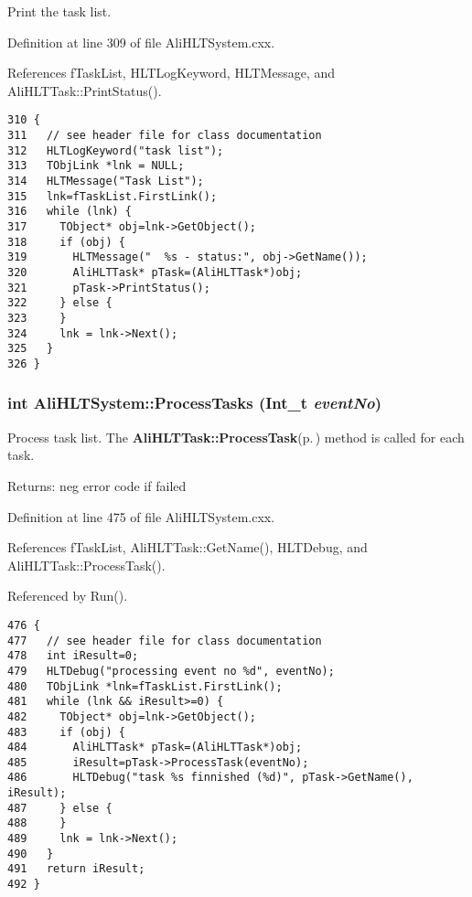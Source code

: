 Print the task list. 

Definition at line 309 of file Ali\-HLTSystem.cxx.

References f\-Task\-List, HLTLog\-Keyword, HLTMessage, and Ali\-HLTTask::Print\-Status().

\footnotesize\begin{verbatim}310 {
311   // see header file for class documentation
312   HLTLogKeyword("task list");
313   TObjLink *lnk = NULL;
314   HLTMessage("Task List");
315   lnk=fTaskList.FirstLink();
316   while (lnk) {
317     TObject* obj=lnk->GetObject();
318     if (obj) {
319       HLTMessage("  %s - status:", obj->GetName());
320       AliHLTTask* pTask=(AliHLTTask*)obj;
321       pTask->PrintStatus();
322     } else {
323     }
324     lnk = lnk->Next();
325   }
326 }
\end{verbatim}\normalsize 


\subsubsection{\setlength{\rightskip}{0pt plus 5cm}int Ali\-HLTSystem::Process\-Tasks (Int\_\-t {\em event\-No})}\label{classAliHLTSystem_a17}


Process task list. The {\bf Ali\-HLTTask::Process\-Task}{\rm (p.\,\pageref{classAliHLTTask_a20})} method is called for each task. \begin{Desc}
\item[Returns:]neg error code if failed \end{Desc}


Definition at line 475 of file Ali\-HLTSystem.cxx.

References f\-Task\-List, Ali\-HLTTask::Get\-Name(), HLTDebug, and Ali\-HLTTask::Process\-Task().

Referenced by Run().

\footnotesize\begin{verbatim}476 {
477   // see header file for class documentation
478   int iResult=0;
479   HLTDebug("processing event no %d", eventNo);
480   TObjLink *lnk=fTaskList.FirstLink();
481   while (lnk && iResult>=0) {
482     TObject* obj=lnk->GetObject();
483     if (obj) {
484       AliHLTTask* pTask=(AliHLTTask*)obj;
485       iResult=pTask->ProcessTask(eventNo);
486       HLTDebug("task %s finnished (%d)", pTask->GetName(), iResult);
487     } else {
488     }
489     lnk = lnk->Next();
490   }
491   return iResult;
492 }
\end{verbatim}\normalsize 


